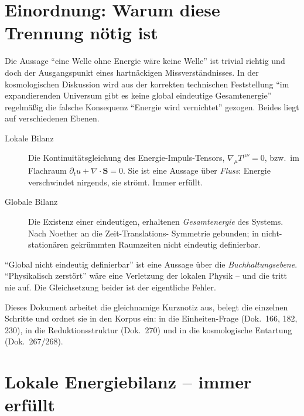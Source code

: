 \section{Einordnung: Warum diese Trennung nötig ist}

Die Aussage \enquote{eine Welle ohne Energie wäre keine Welle} ist trivial
richtig und doch der Ausgangspunkt eines hartnäckigen Missverständnisses. In
der kosmologischen Diskussion wird aus der korrekten technischen Feststellung
\enquote{im expandierenden Universum gibt es keine global eindeutige
Gesamtenergie} regelmäßig die falsche Konsequenz \enquote{Energie wird
vernichtet} gezogen. Beides liegt auf verschiedenen Ebenen.

\begin{definition}\label{def:ebenen277}
\begin{description}
  \item[Lokale Bilanz] Die Kontinuitätsgleichung des Energie-Impuls-Tensors,
    $\nabla_\mu T^{\mu\nu}=0$, bzw.\ im Flachraum
    $\partial_t u + \nabla\!\cdot\mathbf S = 0$. Sie ist eine Aussage über
    \emph{Fluss}: Energie verschwindet nirgends, sie strömt. Immer erfüllt.
  \item[Globale Bilanz] Die Existenz einer eindeutigen, erhaltenen
    \emph{Gesamtenergie} des Systems. Nach Noether an die Zeit-Translations-%
    Symmetrie gebunden; in nicht-stationären gekrümmten Raumzeiten nicht
    eindeutig definierbar.
\end{description}
\end{definition}

\begin{warnung}
\enquote{Global nicht eindeutig definierbar} ist eine Aussage über die
\emph{Buchhaltungsebene}. \enquote{Physikalisch zerstört} wäre eine Verletzung
der lokalen Physik -- und die tritt nie auf. Die Gleichsetzung beider ist der
eigentliche Fehler.
\end{warnung}

Dieses Dokument arbeitet die gleichnamige Kurznotiz aus, belegt die einzelnen
Schritte und ordnet sie in den Korpus ein: in die Einheiten-Frage (Dok.~166,
182, 230), in die Reduktionsstruktur (Dok.~270) und in die kosmologische
Entartung (Dok.~267/268).

\section{Lokale Energiebilanz -- immer erfüllt}

